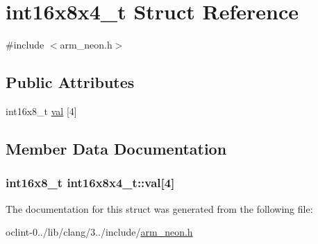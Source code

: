 \hypertarget{structint16x8x4__t}{\section{int16x8x4\-\_\-t Struct Reference}
\label{structint16x8x4__t}
}


{\ttfamily \#include $<$arm\-\_\-neon.\-h$>$}

\subsection*{Public Attributes}
\begin{DoxyCompactItemize}
\item 
int16x8\-\_\-t \hyperlink{structint16x8x4__t_a279e0661e450131bf3ad881e3d770f4b}{val} \mbox{[}4\mbox{]}
\end{DoxyCompactItemize}


\subsection{Member Data Documentation}
\hypertarget{structint16x8x4__t_a279e0661e450131bf3ad881e3d770f4b}{
\subsubsection[{val}]{\setlength{\rightskip}{0pt plus 5cm}int16x8\-\_\-t int16x8x4\-\_\-t\-::val\mbox{[}4\mbox{]}}}\label{structint16x8x4__t_a279e0661e450131bf3ad881e3d770f4b}


The documentation for this struct was generated from the following file\-:\begin{DoxyCompactItemize}
\item 
oclint-\/0../lib/clang/3../include/\hyperlink{arm__neon_8h}{arm\-\_\-neon.\-h}\end{DoxyCompactItemize}

